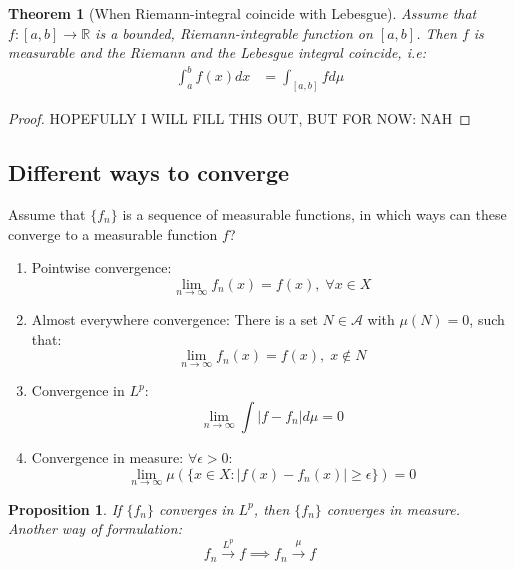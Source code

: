 \documentclass{article}
\newcommand{\R}{\mathbb{R}}
\newcommand{\A}{\mathcal{A}}
\newtheorem{prop}{Proposition}
\newtheorem{proof}{Proof}
\newtheorem{theorem}{Theorem}
\begin{document}
\begin{theorem}[When Riemann-integral coincide with Lebesgue]
Assume that $f:[a,b]\to \R$ is a bounded, Riemann-integrable function on $[a,b]$. Then $f$ is measurable and the Riemann and the Lebesgue integral coincide, i.e: 
\begin{align*}
\int_{a}^{b}f(x)dx &= \int_{[a,b]}fd\mu    
\end{align*}
\end{theorem}



\begin{proof}
HOPEFULLY I WILL FILL THIS OUT, BUT FOR NOW: NAH
\end{proof}

\newpage 

\subsection{Different ways to converge}
Assume that $\{f_{n}\}$ is a sequence of measurable functions, in which ways can these converge to a measurable function $f$? 
\begin{enumerate}
    \item Pointwise convergence: 
    \[\lim_{n\to \infty}f_{n}(x) = f(x), \; \forall x\in X
    \] 
    \item Almost everywhere convergence: There is a set $N\in \A$ with $\mu(N) = 0$, such that: 
    \[\lim_{n\to \infty}f_{n}(x) = f(x), \; x\not\in N
    \]
    \item Convergence in $L^{p}$: 
    \[\lim_{n\to \infty}\int |f-f_{n}|d\mu = 0
    \]
    \item Convergence in measure: $\forall \epsilon>0$: 
    \[\lim_{n\to \infty}\mu(\{x\in X: |f(x)-f_{n}(x)|\geq \epsilon\}) = 0
    \]
\end{enumerate}

\begin{prop}
\label{prop: Convergence in Lp implies convergence in measure}
If $\{f_{n}\}$ converges in $L^{p}$, then $\{f_{n}\}$ converges in measure. Another way of formulation: 
\[f_n \overset{L^p}{\longrightarrow} f \implies f_n \overset{\mu}{\longrightarrow} f
\]
\end{prop}
\end{document}
